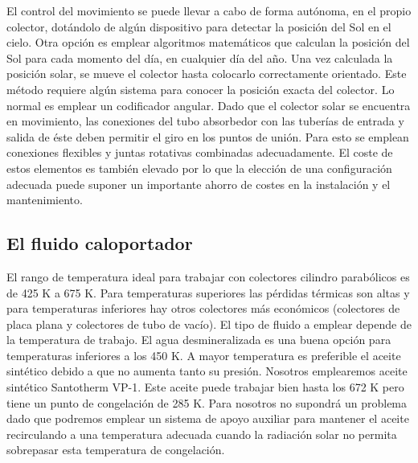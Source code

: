 El control del movimiento se puede llevar a cabo de forma autónoma, en el propio colector,
dotándolo de algún dispositivo para detectar la posición del Sol en el cielo. Otra opción es emplear
algoritmos matemáticos que calculan la posición del Sol para cada momento del día, en cualquier
día del año. Una vez calculada la posición solar, se mueve el colector hasta colocarlo correctamente
orientado. Este método requiere algún sistema para conocer la posición exacta del colector. Lo
normal es emplear un codificador angular.
Dado que el colector solar se encuentra en movimiento, las conexiones del tubo absorbedor con las
tuberías de entrada y salida de éste deben permitir el giro en los puntos de unión. Para esto se
emplean conexiones flexibles y juntas rotativas combinadas adecuadamente. El coste de estos
elementos es también elevado por lo que la elección de una configuración adecuada puede suponer
un importante ahorro de costes en la instalación y el mantenimiento.

\subsection{El fluido caloportador}
\label{fluidocaloportador}

El rango de temperatura ideal para trabajar con colectores cilindro parabólicos es de 425 K a 675 K.
Para temperaturas superiores las pérdidas térmicas son altas y para temperaturas inferiores hay otros
colectores más económicos (colectores de placa plana y colectores de tubo de vacío).
El tipo de fluido a emplear depende de la temperatura de trabajo. El agua desmineralizada es una
buena opción para temperaturas inferiores a los 450 K. A mayor temperatura es preferible el aceite
sintético debido a que no aumenta tanto su presión. Nosotros emplearemos aceite sintético
Santotherm VP-1. Este aceite puede trabajar bien hasta los 672 K pero tiene un punto de
congelación de 285 K. Para nosotros no supondrá un problema dado que podremos emplear un
sistema de apoyo auxiliar para mantener el aceite recirculando a una temperatura adecuada cuando
la radiación solar no permita sobrepasar esta temperatura de congelación.
